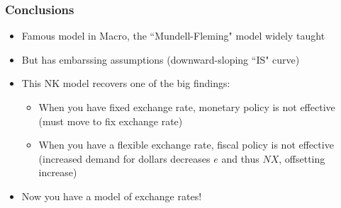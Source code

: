 \documentclass{beamer}
\begin{document}
\begin{frame}
\frametitle[alignment=center]{Conclusions}
\begin{itemize}
\item Famous model in Macro, the ``Mundell-Fleming" model widely taught
\bigskip
\item But has embarssing assumptions (downward-sloping ``IS" curve) 
\bigskip
\item This NK model recovers one of the big findings:
\begin{itemize}
\item When you have fixed exchange rate, monetary policy is not effective (must move to fix exchange rate)
\bigskip
\item When you have a flexible exchange rate, fiscal policy is not effective (increased demand for dollars decreases $e$ and thus $NX$, offsetting increase)
\end{itemize}
\bigskip
\item Now you have a model of exchange rates!
\end{itemize}
\end{frame}
\end{document}
